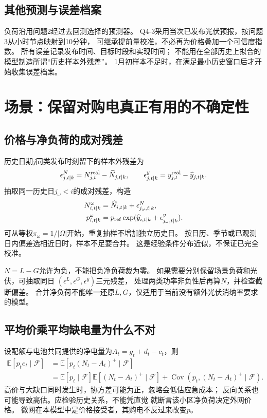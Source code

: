\documentclass[UTF8,11pt]{ctexart}
\newcommand{\E}{\mathbb E}
\begin{document}
\subsection{其他预测与误差档案}
负荷沿用问题2经过去回测选择的预测器。
Q4-3采用当次已发布光伏预报，按问题3从小时节点映射到10分钟，
可继承提前量校准，不必再为价格叠加一个可信度指数。
所有误差记录发布时间、目标时段和实现时间；
不能用在全部历史上拟合的模型制造所谓“历史样本外残差”。
1月初样本不足时，在满足最小历史窗口后才开始收集误差档案。

\section{场景：保留对购电真正有用的不确定性}
\subsection{价格与净负荷的成对残差}
历史日期$j$同类发布时刻留下的样本外残差为
\begin{equation}
 \epsilon^N_{j,t|k}=N^{\rm real}_{j,t}-\widehat N_{j,t|k},
 \qquad
 \epsilon^y_{j,t|k}=y^{\rm real}_{j,t}-\widehat y_{j,t|k}.
\end{equation}
抽取同一历史日$j_\omega<i$的成对残差，构造
\begin{align}
 N_{i,t|k}^{\omega}
    &=\widehat N_{i,t|k}+\epsilon^N_{j_\omega,t|k},\\
 p_{i,t|k}^{\omega}
    &=p_{\rm ref}\exp(\widehat y_{i,t|k}+\epsilon^y_{j_\omega,t|k}).
\end{align}
可从等权$\pi_\omega=1/|\Omega|$开始，重复抽样不增加独立历史日。
按日历、季节或已观测日内偏差选相近日时，样本不足要合并。
这是经验条件分布近似，不保证已完全校准。

$N=L-G$允许为负，不能把负净负荷裁为零。
如果需要分别保留场景负荷和光伏，可抽取同日
$(\epsilon^L,\epsilon^G,\epsilon^y)$三元残差，
处理两类功率非负性后再算$N$，并检查截断偏差。
合并净负荷不能唯一还原$L,G$，仅适用于当前没有额外光伏消纳率要求的模型。

\subsection{平均价乘平均缺电量为什么不对}
设配额与电池共同提供的净电量为$A_t=g_t+d_t-c_t$，则
\begin{align}
 \E[p_te_t\mid\mathcal F]
 &=\E[p_t(N_t-A_t)^+\mid\mathcal F]\\
 &=\E[p_t\mid\mathcal F]\E[(N_t-A_t)^+\mid\mathcal F]
   +\operatorname{Cov}(p_t,(N_t-A_t)^+\mid\mathcal F).
\end{align}
高价与大缺口同时发生时，协方差可能为正，忽略会低估应急成本；
反向关系也可能导致高估。应检验历史关系，不能凭直觉
就断言该小区净负荷决定外网价格。
微网在本模型中是价格接受者，其购电不反过来改变$p$。
\end{document}
